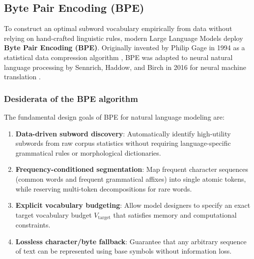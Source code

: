 \documentclass[../../main.tex]{subfiles}
\begin{document}
\subsection{Byte Pair Encoding (BPE)}
\label{subsec:bpe_deep_mechanics}

To construct an optimal subword vocabulary empirically from data without relying on hand-crafted linguistic rules, modern Large Language Models deploy \textbf{Byte Pair Encoding (BPE)}. Originally invented by Philip Gage in 1994 as a statistical data compression algorithm \cite{gage1994}, BPE was adapted to neural natural language processing by Sennrich, Haddow, and Birch in 2016 for neural machine translation \cite{sennrich2016}.

\subsubsection{Desiderata of the BPE algorithm}
The fundamental design goals of BPE for natural language modeling are:
\begin{enumerate}
    \item \textbf{Data-driven subword discovery}: Automatically identify high-utility subwords from raw corpus statistics without requiring language-specific grammatical rules or morphological dictionaries.
    \item \textbf{Frequency-conditioned segmentation}: Map frequent character sequences (common words and frequent grammatical affixes) into single atomic tokens, while reserving multi-token decompositions for rare words.
    \item \textbf{Explicit vocabulary budgeting}: Allow model designers to specify an exact target vocabulary budget $V_{\text{target}}$ that satisfies memory and computational constraints.
    \item \textbf{Lossless character/byte fallback}: Guarantee that any arbitrary sequence of text can be represented using base symbols without information loss.
\end{enumerate}
\end{document}

